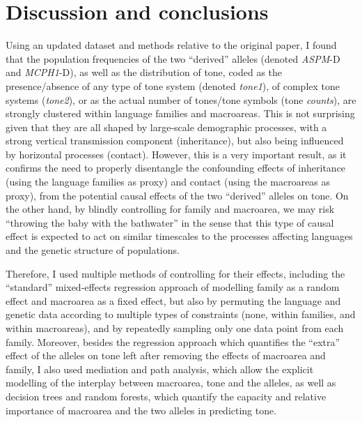 \documentclass[twoside,onecolumn]{article}
\begin{document}

\section{Discussion and conclusions}

Using an updated dataset and methods relative to the original \citet{dediu_ladd_2007} paper, I found that the population frequencies of the two ``derived'' alleles (denoted \textit{ASPM}-D and \textit{MCPH1}-D), as well as the distribution of tone, coded as the presence/absence of any type of tone system (denoted \textit{tone1}), of complex tone systems (\textit{tone2}), or as the actual number of tones/tone symbols (tone \textit{counts}), are strongly clustered within language families and macroareas.
This is not surprising given that they are all shaped by large-scale demographic processes, with a strong vertical transmission component (inheritance), but also being influenced by horizontal processes (contact).
However, this is a very important result, as it confirms the need to properly disentangle the confounding effects of inheritance (using the language families as proxy) and contact (using the macroareas as proxy), from the potential causal effects of the two ``derived'' alleles on tone.
On the other hand, by blindly controlling for family and macroarea, we may risk ``throwing the baby with the bathwater'' in the sense that this type of causal effect is expected to act on similar timescales to the processes affecting languages and the genetic structure of populations.

Therefore, I used multiple methods of controlling for their effects, including the ``standard'' mixed-effects regression approach of modelling family as a random effect and macroarea as a fixed effect, but also by permuting the language and genetic data according to multiple types of constraints (none, within families, and within macroareas), and by repeatedly sampling only one data point from each family.
Moreover, besides the regression approach which quantifies the ``extra'' effect of the alleles on tone left after removing the effects of macroarea and family, I also used mediation and path analysis, which allow the explicit modelling of the interplay between macroarea, tone and the alleles, as well as decision trees and random forests, which quantify the capacity and relative importance of macroarea and the two alleles in predicting tone.
\end{document}
